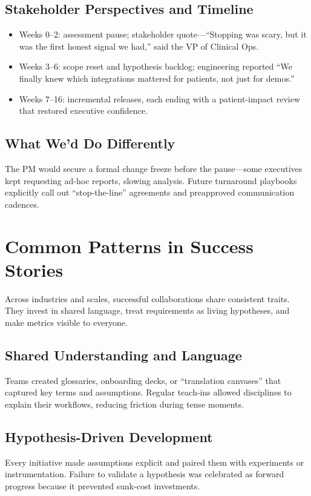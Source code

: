 \subsection{Stakeholder Perspectives and Timeline}
\begin{itemize}
    \item Weeks 0--2: assessment pause; stakeholder quote—``Stopping was scary, but it was the first honest signal we had,'' said the VP of Clinical Ops.
    \item Weeks 3--6: scope reset and hypothesis backlog; engineering reported ``We finally knew which integrations mattered for patients, not just for demos.''
    \item Weeks 7--16: incremental releases, each ending with a patient-impact review that restored executive confidence.
\end{itemize}

\subsection{What We'd Do Differently}
The PM would secure a formal change freeze before the pause—some executives kept requesting ad-hoc reports, slowing analysis. Future turnaround playbooks explicitly call out ``stop-the-line'' agreements and preapproved communication cadences.

\section{Common Patterns in Success Stories}
\label{sec:success-patterns}

Across industries and scales, successful collaborations share consistent traits. They invest in shared language, treat requirements as living hypotheses, and make metrics visible to everyone.

\subsection{Shared Understanding and Language}
Teams created glossaries, onboarding decks, or ``translation canvases'' that captured key terms and assumptions. Regular teach-ins allowed disciplines to explain their workflows, reducing friction during tense moments.

\subsection{Hypothesis-Driven Development}
Every initiative made assumptions explicit and paired them with experiments or instrumentation. Failure to validate a hypothesis was celebrated as forward progress because it prevented sunk-cost investments.

